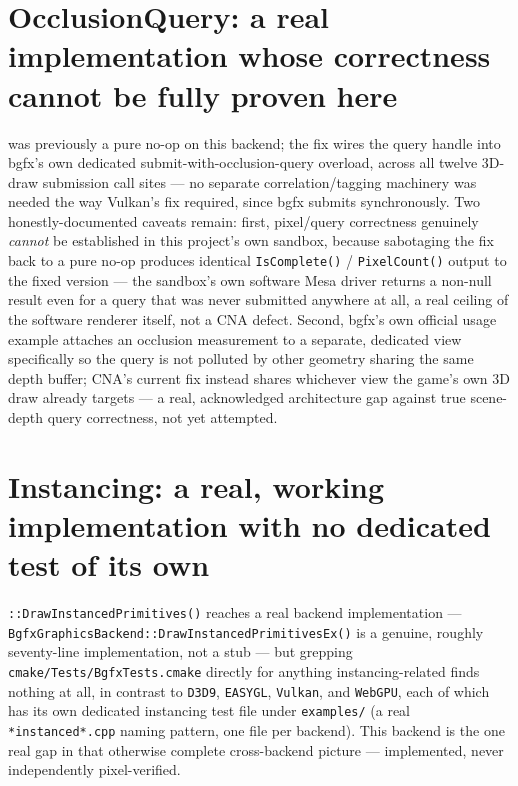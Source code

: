 \section[OcclusionQuery: a real implementation, correctness not provable here]{OcclusionQuery: a real implementation whose correctness cannot be fully proven here}

 was previously a pure no-op on this backend; the fix wires the
query handle into bgfx's own dedicated submit-with-occlusion-query overload, across all
twelve 3D-draw submission call sites --- no separate correlation/tagging machinery was
needed the way Vulkan's fix required, since bgfx submits synchronously. Two honestly-documented
caveats remain: first, pixel/query correctness genuinely \emph{cannot} be established in this
project's own sandbox, because sabotaging the fix back to a pure no-op produces identical
\texttt{IsComplete()} / \texttt{PixelCount()} output to the fixed version --- the sandbox's own
software Mesa driver returns a non-null result even for a query that was never submitted
anywhere at all, a real ceiling of the software renderer itself, not a CNA defect. Second,
bgfx's own official usage example attaches an occlusion measurement to a separate, dedicated
view specifically so the query is not polluted by other geometry sharing the same depth
buffer; CNA's current fix instead shares whichever view the game's own 3D draw already
targets --- a real, acknowledged architecture gap against true scene-depth query correctness,
not yet attempted.

\section{Instancing: a real, working implementation with no dedicated test of its own}
\label{sec:bgfx-instancing}

\allowbreak{}\texttt{::DrawInstancedPrimitives()} reaches a real
backend implementation --- \texttt{BgfxGraphicsBackend::DrawInstancedPrimitivesEx()} is a
genuine, roughly seventy-line implementation, not a stub --- but grepping
\texttt{cmake/Tests/BgfxTests.cmake} directly for anything instancing-related finds nothing at
all, in contrast to \texttt{D3D9}, \texttt{EASYGL}, \texttt{Vulkan}, and \texttt{WebGPU}, each
of which has its own dedicated instancing test file under \texttt{examples/} (a real
\texttt{*instanced*.cpp} naming pattern, one file per backend). This backend is the one real
gap in that otherwise complete cross-backend picture --- implemented, never independently
pixel-verified.


